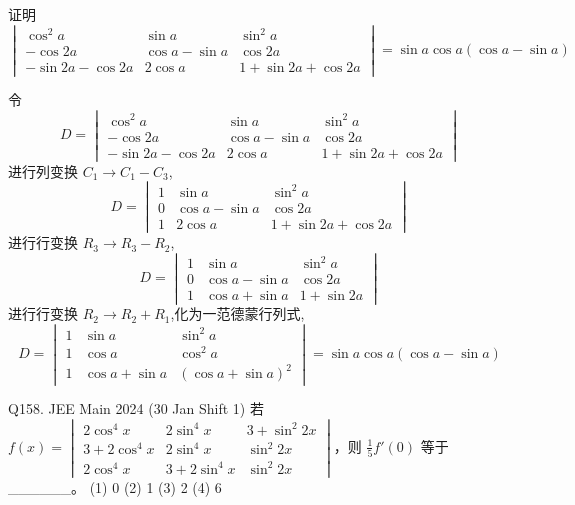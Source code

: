 \begin{questions}
    \question 证明
    \[
    \begin{vmatrix}
    \cos^2 a & \sin a & \sin^2 a \\
    -\cos 2a & \cos a - \sin a & \cos 2a \\
    -\sin 2a - \cos 2a & 2 \cos a & 1 + \sin 2a + \cos 2a
    \end{vmatrix} = \sin a \cos a (\cos a - \sin a)
    \]
    \begin{solution}
        令
        \[
        D=\begin{vmatrix}
        \cos^2 a & \sin a & \sin^2 a \\
        -\cos 2a & \cos a - \sin a & \cos 2a \\
        -\sin 2a - \cos 2a & 2 \cos a & 1 + \sin 2a + \cos 2a
        \end{vmatrix}
        \]
        进行列变换 $C_1 \rightarrow C_1 - C_3$,
        \[
        D=\begin{vmatrix}
        1 & \sin a & \sin^2 a \\
        0 & \cos a - \sin a & \cos 2a \\
        1 & 2 \cos a & 1 + \sin 2a + \cos 2a
        \end{vmatrix}
        \]
        进行行变换 $R_3 \rightarrow R_3 - R_2$,
        \[
        D= \begin{vmatrix}
        1 & \sin a & \sin^2 a \\
        0 & \cos a - \sin a & \cos 2a \\
        1 & \cos a + \sin a & 1 + \sin 2a
        \end{vmatrix}
        \]
        进行行变换 $R_2 \rightarrow R_2 + R_1$,化为一范德蒙行列式,
        \[
        D= \begin{vmatrix}
        1 & \sin a & \sin^2 a \\
        1 & \cos a & \cos^2 a \\
        1 & \cos a + \sin a & (\cos a + \sin a)^2
        \end{vmatrix} 
        = \sin a \cos a (\cos a - \sin a)
        \]  
    \end{solution}

    \question
Q158. JEE Main 2024 (30 Jan Shift 1)
若 $f(x) = \begin{vmatrix} 2 \cos^4 x & 2 \sin^4 x & 3 + \sin^2 2x \\ 3 + 2 \cos^4 x & 2 \sin^4 x & \sin^2 2x \\ 2 \cos^4 x & 3 + 2 \sin^4 x & \sin^2 2x \end{vmatrix}$，则 $\frac{1}{5} f'(0)$ 等于 \_\_\_\_\_\_。
(1) 0 \quad (2) 1 \quad (3) 2 \quad (4) 6


\end{questions}
